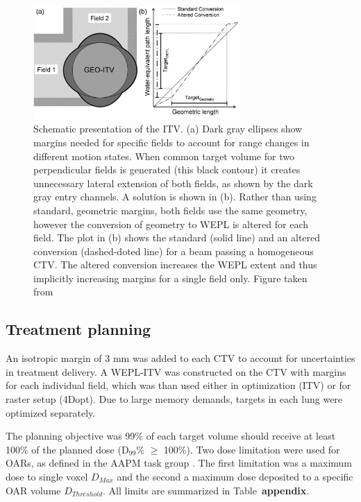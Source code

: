 \documentclass[type=dr, dr=rernat, accentcolor=tud7b,colorbacktitle, bigchapter, openright, twoside, 12pt ]{tudthesis}
\begin{document}
\begin{figure}[H]
	\begin{center}
		\includegraphics[width=0.7\textwidth]{./Images/weplITV.png}
		\caption{Schematic presentation of the ITV. (a) Dark gray ellipses show margins needed for specific fields to account for range changes in different motion states.
		When common target volume for two perpendicular fields is generated (this black contour) it creates unnecessary lateral extension of both fields, as shown by the dark gray
		entry channels. A solution is shown in (b). Rather than using standard, geometric margins, both fields use the same geometry, however the conversion of geometry to WEPL
		is altered for each field. The plot in (b) shows the standard (solid line) and an altered conversion (dashed-doted line) for a beam passing a homogeneous CTV. The altered conversion
		increases the WEPL extent and thus implicitly increasing margins for a single field only. Figure taken from \cite{Graeff2012}}
		\label{Fig:weplITV}
	\end{center}
\end{figure}

\subsection{Treatment planning}

An isotropic margin of 3 mm was added to each CTV to account for uncertainties in treatment delivery. 
A WEPL-ITV was constructed on the CTV with margins for each individual field, which was than used either in optimization (ITV)
or for raster setup (4Dopt). Due to large memory demands, targets in each lung were optimized separately. 
  
The planning objective was 99\% of each target volume should receive at least 100\% of the planned dose (D$_{99}$\% $\geq$ 100\%). Two dose limitation were used for OARs, as defined in 
the AAPM task group \cite{Benedict2010}. The first limitation was a maximum dose to single voxel $D_{Max}$ and the second a maximum dose deposited to a 
specific OAR volume $D_{Threshold}$. All limits are summarized in Table~\textbf{appendix}.
 
\end{document}

